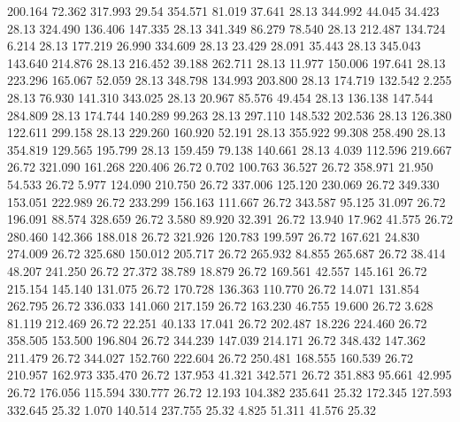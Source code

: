  200.164   72.362  317.993        29.54
 354.571   81.019   37.641        28.13
 344.992   44.045   34.423        28.13
 324.490  136.406  147.335        28.13
 341.349   86.279   78.540        28.13
 212.487  134.724    6.214        28.13
 177.219   26.990  334.609        28.13
  23.429   28.091   35.443        28.13
 345.043  143.640  214.876        28.13
 216.452   39.188  262.711        28.13
  11.977  150.006  197.641        28.13
 223.296  165.067   52.059        28.13
 348.798  134.993  203.800        28.13
 174.719  132.542    2.255        28.13
  76.930  141.310  343.025        28.13
  20.967   85.576   49.454        28.13
 136.138  147.544  284.809        28.13
 174.744  140.289   99.263        28.13
 297.110  148.532  202.536        28.13
 126.380  122.611  299.158        28.13
 229.260  160.920   52.191        28.13
 355.922   99.308  258.490        28.13
 354.819  129.565  195.799        28.13
 159.459   79.138  140.661        28.13
   4.039  112.596  219.667        26.72
 321.090  161.268  220.406        26.72
   0.702  100.763   36.527        26.72
 358.971   21.950   54.533        26.72
   5.977  124.090  210.750        26.72
 337.006  125.120  230.069        26.72
 349.330  153.051  222.989        26.72
 233.299  156.163  111.667        26.72
 343.587   95.125   31.097        26.72
 196.091   88.574  328.659        26.72
   3.580   89.920   32.391        26.72
  13.940   17.962   41.575        26.72
 280.460  142.366  188.018        26.72
 321.926  120.783  199.597        26.72
 167.621   24.830  274.009        26.72
 325.680  150.012  205.717        26.72
 265.932   84.855  265.687        26.72
  38.414   48.207  241.250        26.72
  27.372   38.789   18.879        26.72
 169.561   42.557  145.161        26.72
 215.154  145.140  131.075        26.72
 170.728  136.363  110.770        26.72
  14.071  131.854  262.795        26.72
 336.033  141.060  217.159        26.72
 163.230   46.755   19.600        26.72
   3.628   81.119  212.469        26.72
  22.251   40.133   17.041        26.72
 202.487   18.226  224.460        26.72
 358.505  153.500  196.804        26.72
 344.239  147.039  214.171        26.72
 348.432  147.362  211.479        26.72
 344.027  152.760  222.604        26.72
 250.481  168.555  160.539        26.72
 210.957  162.973  335.470        26.72
 137.953   41.321  342.571        26.72
 351.883   95.661   42.995        26.72
 176.056  115.594  330.777        26.72
  12.193  104.382  235.641        25.32
 172.345  127.593  332.645        25.32
   1.070  140.514  237.755        25.32
   4.825   51.311   41.576        25.32
